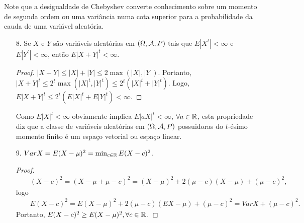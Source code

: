 \begin{frame}
Note que a desigualdade de Chebyshev converte conhecimento sobre um
momento de segunda ordem ou uma variância numa cota superior para a
probabilidade da cauda de uma variável aleatória.

%
%
\begin{itemize}
%
%
%
\item[8.] Se $X$ e $Y$ são variáveis aleatórias em $(\Omega,{\cal A},P)$ tais que $E|X^t|<\infty$ e $E|Y^{t}|<\infty$, então $E|X+Y|^t<\infty$.
\begin{proof}
$|X+Y|\leq |X|+|Y|\leq 2\max(|X|,|Y|)$. Portanto, $|X+Y|^t\leq 2^t\max(|X|^t,|Y|^t)\leq 2^t(|X|^t+|Y|^t)$. Logo, $E|X+Y|^t\leq 2^t(E|X|^t+E|Y|^t)<\infty$.
\end{proof}

Como $E|X|^t<\infty$ obviamente implica $E|aX|^t<\infty$, $\forall a\in \mathbb{R}$, esta propriedade diz que a classe de variáveis aleatórias em $(\Omega,{\cal A},P)$ possuidoras do $t$-ésimo momento finito é um espaço vetorial ou espaço linear.

\item[9.] $Var X=E(X-\mu)^2=\min_{c\in\mathbb{R}}E(X-c)^2$.

\begin{proof}
\begin{eqnarray}
& & (X-c)^2=(X-\mu+\mu-c)^2=(X-\mu)^2+2(\mu-c)(X-\mu)+(\mu-c)^2,
\nonumber
\end{eqnarray}
logo
\begin{eqnarray}
& & E(X-c)^2=E(X-\mu)^2+2(\mu-c)(EX-\mu)+(\mu-c)^2 =Var X +(\mu-c)^2.\nonumber
\end{eqnarray}
Portanto, $E(X-c)^2\geq E(X-\mu)^2, \forall c\in \mathbb{R}$.
\end{proof}

\end{itemize}


\end{frame}
%
